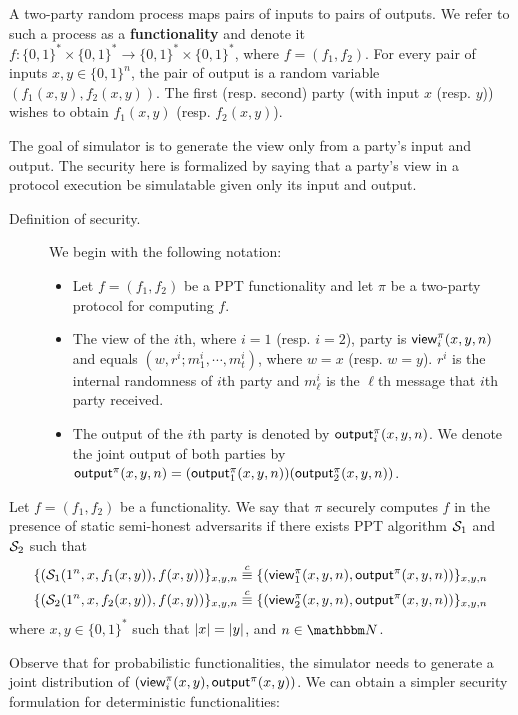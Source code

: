 \begin{definition} A two-party random process maps pairs of inputs to pairs of outputs. We refer to such a process as a {\bf functionality} and denote it $f:\{0,1\}^*\times\{0,1\}^*\to\{0,1\}^*\times\{0,1\}^*$, where $f=(f_1,f_2)$. For every pair of inputs $x,y\in\{0,1\}^n$, the pair of output is a random variable $(f_1(x,y),f_2(x,y))$. The first (resp. second) party (with input $x$ (resp. $y$)) wishes to obtain $f_1(x,y)$ (resp. $f_2(x,y)$).
\end{definition}
The goal of simulator is to generate the view only from a party's input and output. The security here is formalized by saying that a party's view in a protocol execution be simulatable given only its input and output. 
\begin{description}
\item[Definition of security.] We begin with the following notation:
\begin{itemize}[leftmargin=0em]
    \item Let $f=(f_1,f_2)$ be a PPT functionality and let $\pi$ be a two-party protocol for computing $f$.
    \item The view of the $i$th, where $i=1$ (resp. $i=2$), party is ${\sf view}^\pi_i(x,y,n)$ and equals $(w,r^i;m^i_1,\cdots,m^i_t)$, where $w=x$ (resp. $w=y$). $r^i$ is the internal randomness of $i$th party and $m^i_\ell$ is the $\ell$th message that $i$th party received.
    \item The output of the $i$th party is denoted by ${\sf output}^\pi_i(x,y,n)$. We denote the joint output of both parties by ${\sf output}^\pi(x,y,n)=({\sf output}^\pi_1(x,y,n))({\sf output}^\pi_2(x,y,n))$.
\end{itemize}
\end{description}
\begin{definition}Let $f=(f_1,f_2)$ be a functionality. We say that {\sf$\pi$ securely computes $f$ in the presence of static semi-honest adversarits} if there exists PPT algorithm $\mathcal{S}_1$ and $\mathcal{S}_2$ such that
\begin{align*}
    \{(\mathcal{S}_1(1^n,x,f_1(x,y)), f(x,y))\}_{x,y,n} \stackrel{c}{\equiv} \{({\sf view}^\pi_1(x,y,n),{\sf output}^\pi(x,y,n))\}_{x,y,n} \\
    \{(\mathcal{S}_2(1^n,x,f_2(x,y)), f(x,y))\}_{x,y,n} \stackrel{c}{\equiv} \{({\sf view}^\pi_2(x,y,n),{\sf output}^\pi(x,y,n))\}_{x,y,n}
\end{align*}
where $x,y\in\{0,1\}^*$ such that $\left|x\right| = \left|y\right|$, and $n\in\N$.
\end{definition}
Observe that for probabilistic functionalities, the simulator needs to generate a joint distribution of $({\sf view}_i^\pi(x,y), {\sf output}^\pi(x,y))$. We can obtain a simpler security formulation for deterministic functionalities:

